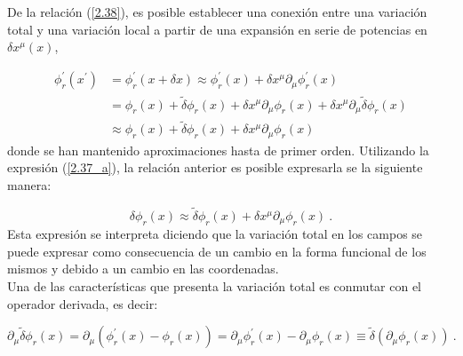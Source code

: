 
\noindent
De la relación (\ref{2.38}), es posible establecer una conexión entre una variación total y una variación local a partir de una expansión en serie de potencias en $\delta x^{\mu}(x)$,

$$
\begin{aligned}
\phi_{r}^{\prime}\left(x^{\prime}\right) &=\phi_{r}^{\prime}(x+\delta x) \approx \phi_{r}^{\prime}(x)+\delta x^{\mu} \partial_{\mu} \phi_{r}^{\prime}(x) \\
&=\phi_{r}(x)+\tilde{\delta} \phi_{r}(x)+\delta x^{\mu} \partial_{\mu} \phi_{r}(x)+\delta x^{\mu} \partial_{\mu} \tilde{\delta} \phi_{r}(x) \\
& \approx \phi_{r}(x)+\tilde{\delta} \phi_{r}(x)+\delta x^{\mu} \partial_{\mu} \phi_{r}(x)
\end{aligned}
$$
donde se han mantenido aproximaciones hasta de primer orden. Utilizando la expresión (\ref{2.37_a}), la relación anterior es posible expresarla se la siguiente manera:

\begin{equation}
\delta \phi_{r}(x) \approx \tilde{\delta} \phi_{r}(x)+\delta x^{\mu} \partial_{\mu} \phi_{r}(x) ~.    
\label{2.38_aa}
\end{equation}
\noindent
Esta expresión se interpreta diciendo que la variación total en los campos se puede expresar como consecuencia de un cambio en la forma funcional de los mismos y debido a un cambio en las coordenadas.\\

\noindent
Una de las características que presenta la variación total es conmutar con el operador derivada, es decir:

\begin{equation}
\partial _{\mu }\tilde{\delta}\phi _{r}\left( x\right) =\partial _{\mu }\left(\phi _{r}^{\prime }\left( x\right) -\phi _{r}\left( x\right) \right)=\partial _{\mu }\phi _{r}^{\prime }\left( x\right) -\partial _{\mu }\phi_{r}\left( x\right) \equiv \tilde{\delta}\left( \partial _{\mu }\phi_{r}\left( x\right) \right) ~.  \label{eq2.42}
\end{equation}


